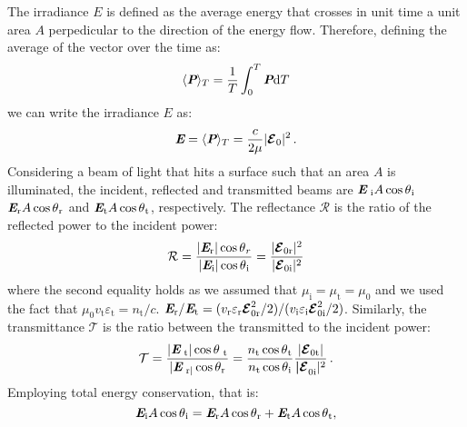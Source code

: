 The irradiance $E$ is defined as the average energy that crosses in unit time a unit area $A$ perpedicular to the direction of the energy flow.
Therefore, defining the average of the vector  over the time as:
\begin{equation}
\langle \textit{\textbf{P}} \rangle_T = \frac{1}{T}\int_0^T \textit{\textbf{P}}\textrm{d}T
\end{equation}
we can write the irradiance $E$ as:
\begin{equation}
\textit{\textbf{E}} = \langle\textit{\textbf{P}}\rangle_{T} = \frac{c}{2\mu}|\boldsymbol{\mathcal{E}}_0|^2\,.
\end{equation}
Considering a beam of light that hits a surface such that an area $A$ is illuminated, the incident, reflected and transmitted beams are 
$\textit{\textbf{E}}_\textrm{
i} A\cos\mbox{$\theta$}_\textrm{i}$ $\textit{\textbf{E}}_\textrm{r} A\cos\mbox{$\theta$}_\textrm{r}$ and 
$\textit{\textbf{E}}_\textrm{t} A\cos\mbox{$\theta$}_\textrm{t}$, respectively. 
The reflectance $\mathcal{R}$ is the ratio of the reflected power to the incident power:
\begin{equation}\label{reflectance}
\mathcal{R} = \frac{|\textit{\textbf{E}}_\textrm{r}|\cos\mbox{$\theta$}_r}{|\textit{\textbf{E}}_\textrm{i}|\cos\mbox{$\theta$}_\textrm{i}} = \frac{|\boldsymbol{\mathcal{E}}_{0 \textrm{r}}|^2}{|\boldsymbol{\mathcal{E}}_{0 \textrm{i}}|^2}
\end{equation}
where the second equality holds as we assumed that $\mu_\textrm{i} = \mu_\textrm{t}  = \mu_0$ and we used the fact that $\mu_0 v_\textrm{t}\varepsilon_\textrm{t}=n_\textrm{t}/c$.
$\textit{\textbf{E}} _\textrm{r}/\textit{\textbf{E}}_\textrm{t} = (v_\textrm{r}\varepsilon_\textrm{r} \boldsymbol{\mathcal{E}}_{0\textrm{r}}^2/2)/(v_\textrm{i}\varepsilon_\textrm{i} \boldsymbol{\mathcal{E}}_{0\textrm{i}}^2/2)$.
Similarly, the transmittance $\mathcal{T}$ is the ratio between the transmitted to the incident power:
\begin{equation}\label{transmittance}
\mathcal{T} = \frac{|\textit{\textbf{E}}_\textrm{
t}| \cos\mbox{$\theta$}_\textrm{
t}}{|\textit{\textbf{E}}_\textrm{
r|}\cos\mbox{$\theta$}_\textrm{r}} = \frac{n_\textrm{t} \cos\mbox{$\theta$}_\textrm{t}}{n_\textrm{t} \cos\mbox{$\theta$}_\textrm{i}}\frac{|\boldsymbol{\mathcal{E}}_{0 \textrm{t}}|}{\boldsymbol{|\mathcal{E}}_{0 \textrm{i}}|^2}\,.
\end{equation}
Employing total energy conservation, that is:
\begin{equation}
\textit{\textbf{E}}_\textrm{i} A\cos\mbox{$\theta$}_\textrm{i} = \textit{\textbf{E}}_\textrm{r} A\cos\mbox{$\theta$}_\textrm{r}+\textit{\textbf{E}}_\textrm{t} A\cos\mbox{$\theta$}_\textrm{t},
\end{equation}
